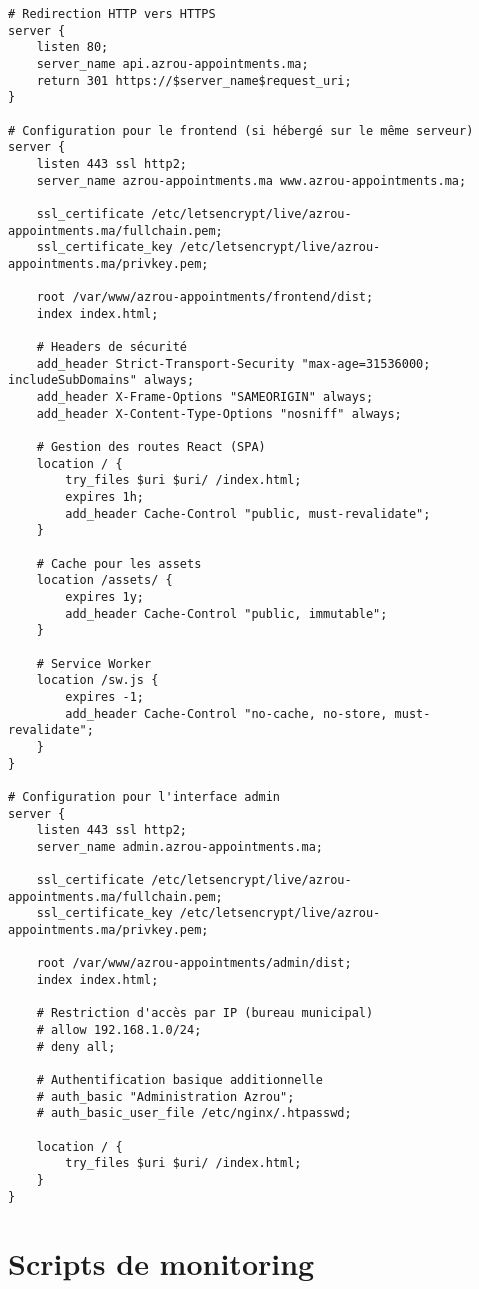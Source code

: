 \begin{lstlisting}[caption=nginx.conf - Configuration Nginx complète]
# Redirection HTTP vers HTTPS
server {
    listen 80;
    server_name api.azrou-appointments.ma;
    return 301 https://$server_name$request_uri;
}

# Configuration pour le frontend (si hébergé sur le même serveur)
server {
    listen 443 ssl http2;
    server_name azrou-appointments.ma www.azrou-appointments.ma;
    
    ssl_certificate /etc/letsencrypt/live/azrou-appointments.ma/fullchain.pem;
    ssl_certificate_key /etc/letsencrypt/live/azrou-appointments.ma/privkey.pem;
    
    root /var/www/azrou-appointments/frontend/dist;
    index index.html;
    
    # Headers de sécurité
    add_header Strict-Transport-Security "max-age=31536000; includeSubDomains" always;
    add_header X-Frame-Options "SAMEORIGIN" always;
    add_header X-Content-Type-Options "nosniff" always;
    
    # Gestion des routes React (SPA)
    location / {
        try_files $uri $uri/ /index.html;
        expires 1h;
        add_header Cache-Control "public, must-revalidate";
    }
    
    # Cache pour les assets
    location /assets/ {
        expires 1y;
        add_header Cache-Control "public, immutable";
    }
    
    # Service Worker
    location /sw.js {
        expires -1;
        add_header Cache-Control "no-cache, no-store, must-revalidate";
    }
}

# Configuration pour l'interface admin
server {
    listen 443 ssl http2;
    server_name admin.azrou-appointments.ma;
    
    ssl_certificate /etc/letsencrypt/live/azrou-appointments.ma/fullchain.pem;
    ssl_certificate_key /etc/letsencrypt/live/azrou-appointments.ma/privkey.pem;
    
    root /var/www/azrou-appointments/admin/dist;
    index index.html;
    
    # Restriction d'accès par IP (bureau municipal)
    # allow 192.168.1.0/24;
    # deny all;
    
    # Authentification basique additionnelle
    # auth_basic "Administration Azrou";
    # auth_basic_user_file /etc/nginx/.htpasswd;
    
    location / {
        try_files $uri $uri/ /index.html;
    }
}
\end{lstlisting}

\section{Scripts de monitoring}

